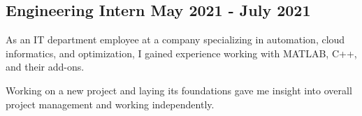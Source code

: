 \documentclass[a4paper,12pt]{article}
\begin{document}
\subsection{{Engineering Intern }\hfill May 2021 - July 2021}
\begin{zitemize}
\item As an IT department employee at a company specializing in automation, cloud informatics, and optimization, I gained experience working with MATLAB, C++, and their add-ons.
\item Working on a new project and laying its foundations gave me insight into overall project management and working independently.
\end{zitemize}
\end{document}
